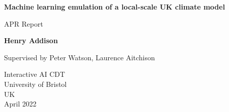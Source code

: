 \documentclass[onecolumn]{article}
\begin{document}
\listoftodos


\begin{titlepage}
    \begin{center}
        \vspace*{1cm}

        \Huge
        \textbf{Machine learning emulation of a local-scale UK climate model}

        \vspace{0.5cm}
        \LARGE
        APR Report

        \vspace{1.5cm}

        \textbf{Henry Addison}

        Supervised by Peter Watson, Laurence Aitchison

        \vfill

        \vspace{0.8cm}

        \Large
        Interactive AI CDT\\
        University of Bristol\\
        UK\\
        April 2022

    \end{center}
\end{titlepage}




\end{document}
